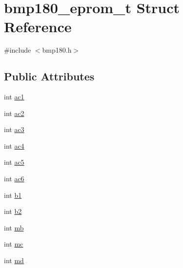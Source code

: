 \hypertarget{structbmp180__eprom__t}{\section{bmp180\+\_\+eprom\+\_\+t Struct Reference}
\label{structbmp180__eprom__t}
}


{\ttfamily \#include $<$bmp180.\+h$>$}

\subsection*{Public Attributes}
\begin{DoxyCompactItemize}
\item 
int \hyperlink{structbmp180__eprom__t_ae588ab126a5cc122d31b032868d90722}{ac1}
\item 
int \hyperlink{structbmp180__eprom__t_a8d47f8518ac03f436daa901ca39ec94d}{ac2}
\item 
int \hyperlink{structbmp180__eprom__t_afab9b64c45c424fbc53a831ea89bdfa1}{ac3}
\item 
int \hyperlink{structbmp180__eprom__t_a78dccc67e89521c40cccadbd97e53638}{ac4}
\item 
int \hyperlink{structbmp180__eprom__t_aeea9752a477d8f18fbb62b0c89df4fd8}{ac5}
\item 
int \hyperlink{structbmp180__eprom__t_a25ed4b144b44291b7ce0e6c541dc7d81}{ac6}
\item 
int \hyperlink{structbmp180__eprom__t_a05d3c6b4dbacea3865e0d2921c73947b}{b1}
\item 
int \hyperlink{structbmp180__eprom__t_a8a15072c4811b8aab47aa1f56ed5f9cf}{b2}
\item 
int \hyperlink{structbmp180__eprom__t_a3c8b4ef002f6352df19067f96d85f770}{mb}
\item 
int \hyperlink{structbmp180__eprom__t_a4b07d3718d0b5973da174b833a3b89b7}{mc}
\item 
int \hyperlink{structbmp180__eprom__t_ac95bfabf36f884f842017c7306fe34e6}{md}
\end{DoxyCompactItemize}


